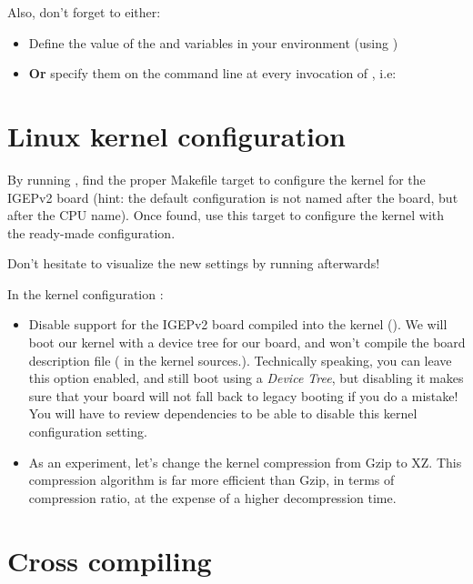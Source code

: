 Also, don't forget to either:

\begin{itemize}
\item Define the value of the  and 
  variables in your environment (using )
\item {\bf Or} specify them on the command line at every invocation of
  , i.e: 
\end{itemize}

\section{Linux kernel configuration}

By running , find the proper Makefile target to
configure the kernel for the IGEPv2 board (hint: the default
configuration is not named after the board, but after the CPU
name). Once found, use this target to configure the kernel with the
ready-made configuration.

Don't hesitate to visualize the new settings by running
 afterwards!

In the kernel configuration :

\begin{itemize}

\item Disable support for the IGEPv2 board compiled into the kernel
  (). We will boot our kernel with a device
  tree for our board, and won't compile the board description file
  ( in the kernel
  sources.). Technically speaking, you can leave this option enabled,
  and still boot using a {\em Device Tree}, but disabling it makes
  sure that your board will not fall back to legacy booting if you do
  a mistake! You will have to review dependencies to be able to
  disable this kernel configuration setting.
\item As an experiment, let's change the kernel compression from Gzip
  to XZ. This compression algorithm is far more efficient than Gzip,
  in terms of compression ratio, at the expense of a higher
  decompression time.
\end{itemize}

\section{Cross compiling}

